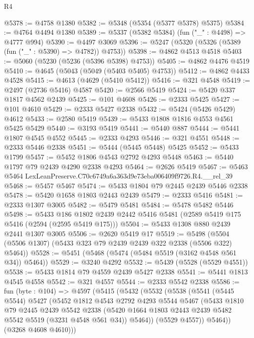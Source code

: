 \begin{lexlean}{R4}
\begin{coremodule}
@5378 := @4758 @1380
@5382 := @5348 (@5354 (@5377 @5378) @5375)
@5384 := @4764 @4494 @1380
@5389 := @5337 (@5382 @5384) (fun ("_" : @4498) => @4777 @994)
@5390 := @4497 @3069
@5396 := @5247 (@5320 (@5326 (@5389 (fun ("_" : @5390) => @4782)) @4753))
@5398 := @4862 @4513 @4518
@5403 := @5060 (@5230 (@5236 (@5396 @5398) @4753))
@5405 := @4862 @4476 @4519
@5410 := @4645 (@5043 (@5049 (@5403 @5405) @4753))
@5412 := @4862 @4433 @4528
@5415 := @4613 (@4629 (@5410 @5412))
@5416 := @321 @4548
@5419 := @2497 (@2736 @5416) @4587
@5420 := @2566 @5419
@5424 := @5420 @337 @1817 @4562 @2439
@5425 := @101 @4608
@5426 := @2333 @5425
@5427 := @101 @4610
@5429 := @2333 @5427 @2338
@5432 := @5424 (@5426 @5429) @4612
@5433 := @2580 @5419
@5439 := @5433 @1808 @1816 @4553 @4561 @5425 @5429
@5440 := @3193 @5419
@5441 := @5440 @887
@5444 := @5441 @1807 @4545 @4552
@5445 := @2333 @4293
@5446 := @321 @4551
@5448 := @2333 @5446 @2338
@5451 := @5444 (@5445 @5448) @5425
@5452 := @5433 @1799
@5457 := @5452 @1806 @4543 @2792 @4293 @5448
@5463 := @5440 @1797 @79 @2439 @4290 @2338 @4293
@5464 := @2626 @5419
@5467 := @5463 @5464 LexLeanPreserve.C70c6749a6a363d9e73eba006409f9726.R4.__rel_39
@5468 := @5457 @5467
@5474 := @5433 @1804 @79 @2445 @2439 @5446 @2338
@5478 := @5420 @1658 @1803 @2443 @2439
@5479 := @2333 @5416
@5481 := @2333 @1307 @3005
@5482 := @5479 @5481
@5484 := @5478 @5482 @5446
@5498 := @5433
    @186
    @1802
    @2439
    @2442
    @5416
    @5481
    (@2589 @5419 @175 @5416 (@2594 (@2595 @5419 @175)))
@5504 := @5433 @1308 @880 @2439 @2441 @1307 @3005
@5506 := @2620 @5419 @17
@5519 := @5498 (@5504 (@5506 @1307) (@5433 @323 @79 @2439 @2439 @322 @2338 (@5506 @322) @5464))
@5528 := @5451 (@5468 (@5474 (@5484 @5519 (@3162 @4548 @561 @34)) @5464))
@5529 := @3240 @4292
@5532 := @5439 (@5528 (@5529 @4551))
@5538 := @5433 @1814 @79 @4559 @2439 @5427 @2338
@5541 := @5441 @1813 @4545 @4558
@5542 := @321 @4557
@5544 := @2333 @5542 @2338
@5586 := fun (byte : @104) =>
  @4597
    (@5415
      (@5432
        (@5532
          (@5538
            (@5541
              (@5445 @5544)
              @5427
              (@5452
                @1812
                @4543
                @2792
                @4293
                @5544
                @5467
                (@5433
                  @1810
                  @79
                  @2445
                  @2439
                  @5542
                  @2338
                  (@5420 @1664 @1803 @2443 @2439 @5482 @5542 @5519 (@3231 @4548 @561 @34))
                  @5464))
              (@5529 @4557))
            @5464))
        (@3268 @4608 @4610)))

\end{coremodule}
\end{lexlean}
